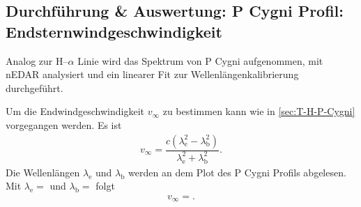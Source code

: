\subsection{Durchführung \& Auswertung: P Cygni Profil:\\Endsternwindgeschwindigkeit}
Analog zur H--$\alpha $ Linie wird das Spektrum von P Cygni aufgenommen, mit nEDAR analysiert und ein linearer Fit zur Wellenlängenkalibrierung durchgeführt.

Um die Endwindgeschwindigkeit $v_\infty$ zu bestimmen kann wie in \ref{sec:T-H-P-Cygni} vorgegangen werden.
Es ist
\begin{align} 
  v_\infty=\dfrac{c\left(\lambda _\text{e}^2-\lambda _\text{b}^2\right)}{\lambda _\text{e}^2+\lambda _\text{b}^2}
.\end{align} 
Die Wellenlängen $\lambda _\text{e}$ und $\lambda _\text{b}$ werden an dem Plot des P Cygni Profils abgelesen.
Mit $\lambda _\text{e}=$ und $\lambda _\text{b}=$ folgt
\begin{align} 
  v_\infty=
.\end{align} 
